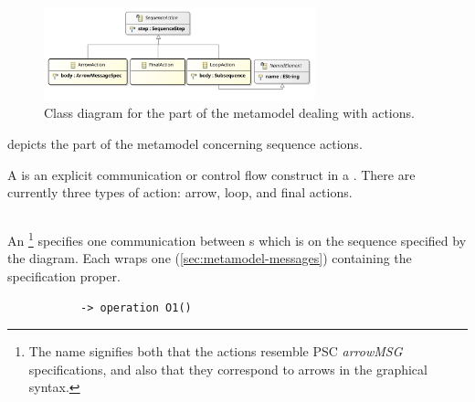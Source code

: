 \begin{figure}
	\centering
	\includegraphics[width=0.7\textwidth]{diagrams/Actions}
	\caption{Class diagram for the part of the \langname{} metamodel dealing with actions.}
	\label{fig:metamodel-actions}
\end{figure}

 depicts the part of the metamodel concerning
sequence actions.

A \msequenceaction{} is an explicit communication or control flow construct in a
\msubsequence.  There are currently three types of action: arrow, loop, and
final actions.

\subsection{\marrowaction}

An \marrowaction\footnote{The name signifies both that the actions resemble
PSC \emph{arrowMSG} specifications, and also that they correspond to arrows in
the graphical syntax.} specifies one communication between \mactor s which is on
the sequence specified by the diagram.  Each \marrowaction{} wraps one
\marrowmessagespec{} (\cref{sec:metamodel-messages})
containing the specification proper.

\begin{figure}[h]

\begin{subfigure}[t]{0.38\textwidth}
\begin{lstlisting}[style=Example]
-> operation O1()
\end{lstlisting}
\end{subfigure}
\hfill
\begin{subfigure}[t]{0.58\textwidth}
\gsecaption
\centering
{}
\end{subfigure}

\end{figure}

